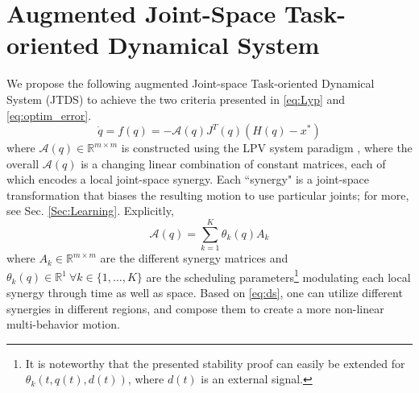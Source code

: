 \documentclass[letterpaper, 10 pt, conference,fleqn]{ieeeconf}
\begin{document}
\section{Augmented \textbf{J}oint-Space \textbf{T}ask-oriented \textbf{D}ynamical \textbf{S}ystem} \label{Sec:DS}
\label{sec:proposed_system}
We propose the following augmented Joint-space Task-oriented Dynamical System (JTDS) to achieve the two criteria presented in \eqref{eq:Lyp} and \eqref{eq:optim_error}.
\begin{equation}
\label{eq:ds}
\dot{q} = f(q) = -\mathcal{A}(q)J^T(q)(H(q) - x^*)
\end{equation}
where  $\mathcal{A}(q)\in \mathbb{R}^{m\times m}$ is constructed using the LPV system paradigm \cite{emedi2016fixed,7439839}, where the overall $\mathcal{A}(q)$ is a changing linear combination of constant  matrices, each of which encodes a local joint-space synergy. Each ``synergy" is a joint-space transformation that biases the resulting motion to use particular joints; for more, see Sec. \ref{Sec:Learning}. Explicitly,
\begin{equation}
\label{eq:A_def}
\mathcal{A}(q) = \sum_{k=1}^{K}\theta_k(q)A_k 
\end{equation}
where $A_k\in \mathbb{R}^{m\times m} $ are the different synergy matrices and $\theta_k(q)\in \mathbb{R}^{1}~\forall k\in\{1,\dots,K\} $ are the scheduling parameters\footnote{%
It is noteworthy that the presented stability proof can easily be extended for $\theta_k (t, q(t), d(t))$, where $d(t)$ is an external signal.} modulating each local synergy through time as well as space. Based on \eqref{eq:ds}, one can utilize different synergies in different regions, and compose them to create a more non-linear multi-behavior motion.
\end{document}
